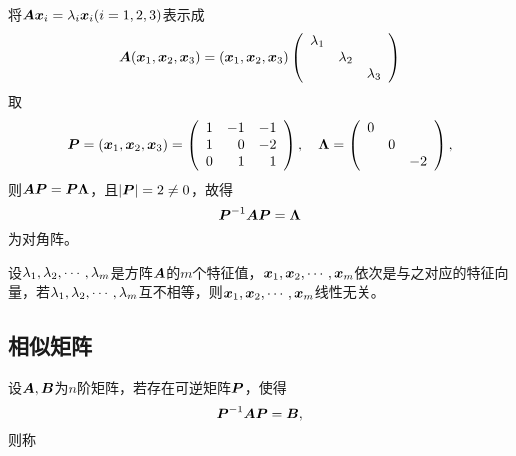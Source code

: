 \begin{frame}
\begin{jie}
将$\A\xx_i=\lambda_i\xx_i(i=1,2,3)$表示成
$$
\A(\xx_1,\xx_2,\xx_3)=(\xx_1,\xx_2,\xx_3)\left(
  \begin{array}{ccc}
    \lambda_1&&\\
    &\lambda_2\\
    &&\lambda_3\\
  \end{array}
\right)
$$
取
$$
\PP=(\xx_1,\xx_2,\xx_3)=\left(
  \begin{array}{rrr}
    1&-1&-1\\
    1& 0&-2\\
    0& 1& 1
  \end{array}
\right), \quad \Lambdabd=\left(
  \begin{array}{rrr}
    0&&\\
     &0&\\
     & &-2
  \end{array}
\right),
$$
则$\A\PP=\PP\Lambdabd$，且$|\PP|=2\ne 0$，故得
$$
\PP^{-1}\A\PP=\Lambdabd
$$
为对角阵。
\end{jie}
\end{frame}

\begin{frame}[fragile]

\begin{dingli}
  设$\lambda_1,\lambda_2,\cd,\lambda_m$是方阵$\A$的$m$个特征值，$\xx_1,\xx_2,\cd,\xx_m$依次是与之对应的特征向量，若$\lambda_1,\lambda_2,\cd,\lambda_m$互不相等，则$\xx_1,\xx_2,\cd,\xx_m$线性无关。
\end{dingli}
\end{frame}


\subsection{相似矩阵}

\begin{frame}[fragile]\ft{\subsecname}
\begin{dingyi}
  设$\A,\B$为$n$阶矩阵，若存在可逆矩阵$\PP$，使得
  $$
  \PP^{-1}\A\PP=\B,
  $$
  则称
\end{dingyi}
\end{frame}

